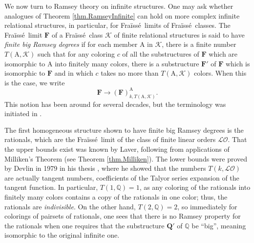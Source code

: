 \documentclass{amsart}
\theoremstyle{remark}
\theoremstyle{definition}
\theoremstyle{remark}
\newcommand{\A}{\mathrm{A}}
\newcommand{\ra}{\rightarrow}
\newcommand{\Fraisse}{Fra{\"{i}}ss{\'{e}}}
\begin{document}
We now turn to Ramsey theory on infinite structures.
One may  ask whether analogues of Theorem \ref{thm.RamseyInfinite}
 can hold on more complex
 infinite relational structures,
 in particular, for  \Fraisse\ limits of
\Fraisse\ classes.
The
 \Fraisse\ limit
 $\mathbf{F}$ of  a \Fraisse\ class $\mathcal{K}$  of finite relational structures is said to have  {\em finite big Ramsey degrees} if for each  member $\A$  in $\mathcal{K}$,
there is a finite number $T(\A,\mathcal{K})$ such that for any coloring $c$ of all the substructures of $\mathbf{F}$ which are isomorphic to $\A$ into finitely many colors,
there is a substructure $\mathbf{F}'$ of $\mathbf{F}$ which is isomorphic to $\mathbf{F}$ and in which $c$ takes  no more than $T(\A,\mathcal{K})$ colors.
When this is the case, we write
\begin{equation}
\mathbf{F}\ra(\mathbf{F})^{\A}_{k,T(\A,\mathcal{K})}.
\end{equation}
This notion has been around  for several decades,
but the terminology was initiated in
 \cite{Kechris/Pestov/Todorcevic05}.


The first homogeneous structure shown to have finite big Ramsey degrees is the rationals, which are the \Fraisse\ limit of the class of finite linear orders $\mathcal{LO}$.
That the upper bounds exist was known by Laver,
 following from  applications of Milliken's Theorem (see Theorem \ref{thm.Milliken}).
The lower bounds were proved by Devlin  in 1979 in his thesis \cite{DevlinThesis}, where he showed that the numbers $T(k,\mathcal{LO})$ are actually tangent numbers, coefficients of the Talyor series expansion of the tangent function.
In particular, $T(1,\mathbb{Q})=1$, as any coloring of the rationals into finitely many colors contains a copy of the rationals in one color;
thus, the rationals are {\em indivisible}.
On the other hand,
$T(2,\mathbb{Q})=2$, so immediately for colorings of pairsets of rationals, one sees that there is no Ramsey property for the rationals when one requires that the substructure $\mathbf{Q}'$ of $\mathbb{Q}$ be ``big'', meaning isomorphic to the original infinite one.
\end{document}

